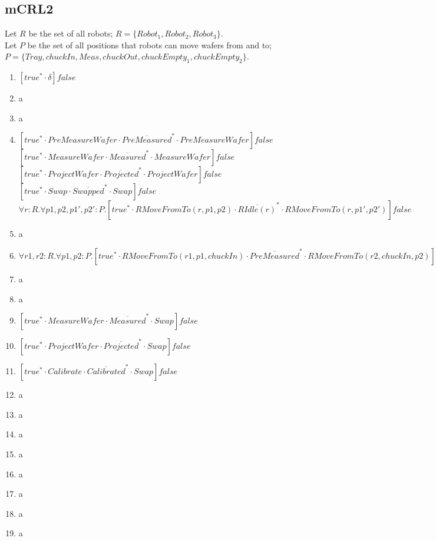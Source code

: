 \subsection{mCRL2}
Let $R$ be the set of all robots; $R = \{Robot_1, Robot_2, Robot_3\}$.\\
Let $P$ be the set of all positions that robots can move wafers from and to; $P = \{Tray, chuckIn, Meas, chuckOut, chuckEmpty_1, chuckEmpty_2\}$.
\begin{enumerate}
    \item $[true^{*}\cdot \delta]false$
    \item a
    \item a
    \item 
	    $[true^{*}\cdot PreMeasureWafer \cdot \overline{PreMeasured}^{*} \cdot PreMeasureWafer]false$\\
	    $[true^{*}\cdot MeasureWafer \cdot \overline{Measured}^{*} \cdot MeasureWafer]false$\\
	    $[true^{*}\cdot ProjectWafer \cdot \overline{Projected}^{*} \cdot ProjectWafer]false$\\
	    $[true^{*}\cdot Swap \cdot \overline{Swapped}^{*} \cdot Swap]false$\\
	    $\forall r:R.\forall p1,p2,p1',p2':P.[true^{*}\cdot RMoveFromTo(r, p1, p2) \cdot \overline{RIdle(r)}^{*} \cdot RMoveFromTo(r, p1', p2')]false$\\
    \item a
    \item $\forall r1,r2:R.\forall p1,p2:P.[true^{*}\cdot RMoveFromTo(r1, p1, chuckIn) \cdot \overline{PreMeasured}^{*} \cdot RMoveFromTo(r2, chuckIn, p2)]false$
    \item a
    \item a
    \item $[true^{*}\cdot MeasureWafer\cdot \overline{Measured}^{*}\cdot Swap]false$
    \item $[true^{*}\cdot ProjectWafer\cdot \overline{Projected}^{*}\cdot Swap]false$
    \item $[true^{*}\cdot Calibrate\cdot \overline{Calibrated}^{*}\cdot Swap]false$
    \item a
    \item a
    \item a
    \item a
    \item a
    \item a
    \item a
    \item a
\end{enumerate}